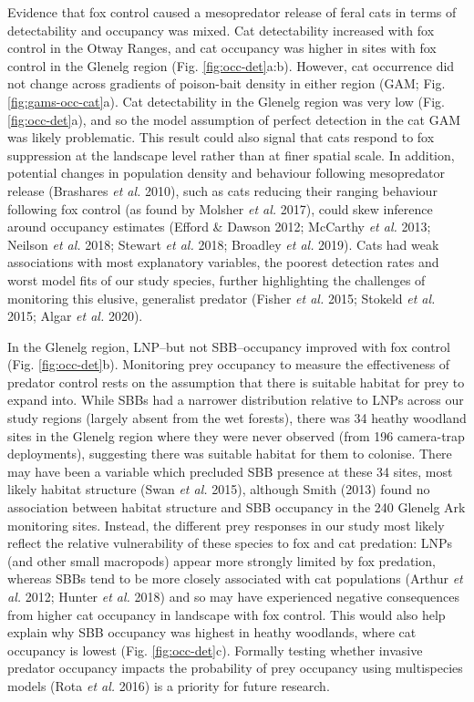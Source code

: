 \documentclass[11pt,a4paper,titlepage,twoside,openright]{style/unimelbthesis}
\begin{document}
\begin{mainmatter}
Evidence that fox control caused a mesopredator release of feral cats in terms of detectability and occupancy was mixed. Cat detectability increased with fox control in the Otway Ranges, and cat occupancy was higher in sites with fox control in the Glenelg region (Fig. \ref{fig:occ-det}a:b). However, cat occurrence did not change across gradients of poison-bait density in either region (GAM; Fig. \ref{fig:gams-occ-cat}a). Cat detectability in the Glenelg region was very low (Fig. \ref{fig:occ-det}a), and so the model assumption of perfect detection in the cat GAM was likely problematic. This result could also signal that cats respond to fox suppression at the landscape level rather than at finer spatial scale. In addition, potential changes in population density and behaviour following mesopredator release (Brashares \emph{et al.} 2010), such as cats reducing their ranging behaviour following fox control (as found by Molsher \emph{et al.} 2017), could skew inference around occupancy estimates (Efford \& Dawson 2012; McCarthy \emph{et al.} 2013; Neilson \emph{et al.} 2018; Stewart \emph{et al.} 2018; Broadley \emph{et al.} 2019). Cats had weak associations with most explanatory variables, the poorest detection rates and worst model fits of our study species, further highlighting the challenges of monitoring this elusive, generalist predator (Fisher \emph{et al.} 2015; Stokeld \emph{et al.} 2015; Algar \emph{et al.} 2020).

In the Glenelg region, LNP--but not SBB--occupancy improved with fox control (Fig. \ref{fig:occ-det}b). Monitoring prey occupancy to measure the effectiveness of predator control rests on the assumption that there is suitable habitat for prey to expand into. While SBBs had a narrower distribution relative to LNPs across our study regions (largely absent from the wet forests), there was 34 heathy woodland sites in the Glenelg region where they were never observed (from 196 camera-trap deployments), suggesting there was suitable habitat for them to colonise. There may have been a variable which precluded SBB presence at these 34 sites, most likely habitat structure (Swan \emph{et al.} 2015), although Smith (2013) found no association between habitat structure and SBB occupancy in the 240 Glenelg Ark monitoring sites. Instead, the different prey responses in our study most likely reflect the relative vulnerability of these species to fox and cat predation: LNPs (and other small macropods) appear more strongly limited by fox predation, whereas SBBs tend to be more closely associated with cat populations (Arthur \emph{et al.} 2012; Hunter \emph{et al.} 2018) and so may have experienced negative consequences from higher cat occupancy in landscape with fox control. This would also help explain why SBB occupancy was highest in heathy woodlands, where cat occupancy is lowest (Fig. \ref{fig:occ-det}c). Formally testing whether invasive predator occupancy impacts the probability of prey occupancy using multispecies models (Rota \emph{et al.} 2016) is a priority for future research.


\end{mainmatter}
\end{document}
